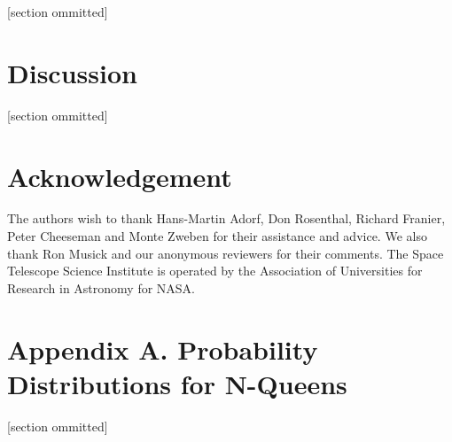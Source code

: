 \documentclass[twoside,12pt,titlepage,a4paper]{article}
\begin{document}
 [section ommitted]

\section{Discussion}

 [section ommitted]

\section{Acknowledgement}
The authors wish to thank Hans-Martin Adorf, Don Rosenthal, 
Richard Franier, Peter Cheeseman and Monte Zweben for their assistance
and advice.  We also thank Ron Musick and our anonymous reviewers for
their comments.  The Space Telescope Science Institute is operated by
the Association of Universities for Research in Astronomy for NASA.

\appendix
\section*{Appendix A. Probability Distributions for N-Queens}


[section ommitted]



\vskip 0.2in


\end{document}
